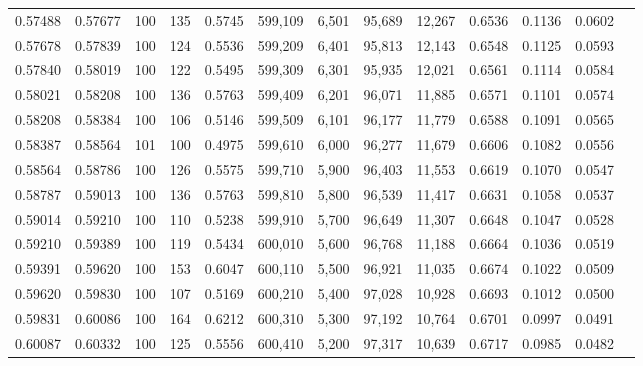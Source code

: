 \begin{tabular}{rrrrrrrrrrrrr}
0.57488 & 0.57677 &   100 & 135 &                                     0.5745 & 599,109 &   6,501 &  95,689 &  12,267 & 0.6536 & 0.1136 & 0.0602 \\
0.57678 & 0.57839 &   100 & 124 &                                     0.5536 & 599,209 &   6,401 &  95,813 &  12,143 & 0.6548 & 0.1125 & 0.0593 \\
0.57840 & 0.58019 &   100 & 122 &                                     0.5495 & 599,309 &   6,301 &  95,935 &  12,021 & 0.6561 & 0.1114 & 0.0584 \\
0.58021 & 0.58208 &   100 & 136 &                                     0.5763 & 599,409 &   6,201 &  96,071 &  11,885 & 0.6571 & 0.1101 & 0.0574 \\
0.58208 & 0.58384 &   100 & 106 &                                     0.5146 & 599,509 &   6,101 &  96,177 &  11,779 & 0.6588 & 0.1091 & 0.0565 \\
0.58387 & 0.58564 &   101 & 100 &                                     0.4975 & 599,610 &   6,000 &  96,277 &  11,679 & 0.6606 & 0.1082 & 0.0556 \\
0.58564 & 0.58786 &   100 & 126 &                                     0.5575 & 599,710 &   5,900 &  96,403 &  11,553 & 0.6619 & 0.1070 & 0.0547 \\
0.58787 & 0.59013 &   100 & 136 &                                     0.5763 & 599,810 &   5,800 &  96,539 &  11,417 & 0.6631 & 0.1058 & 0.0537 \\
0.59014 & 0.59210 &   100 & 110 &                                     0.5238 & 599,910 &   5,700 &  96,649 &  11,307 & 0.6648 & 0.1047 & 0.0528 \\
0.59210 & 0.59389 &   100 & 119 &                                     0.5434 & 600,010 &   5,600 &  96,768 &  11,188 & 0.6664 & 0.1036 & 0.0519 \\
0.59391 & 0.59620 &   100 & 153 &                                     0.6047 & 600,110 &   5,500 &  96,921 &  11,035 & 0.6674 & 0.1022 & 0.0509 \\
0.59620 & 0.59830 &   100 & 107 &                                     0.5169 & 600,210 &   5,400 &  97,028 &  10,928 & 0.6693 & 0.1012 & 0.0500 \\
0.59831 & 0.60086 &   100 & 164 &                                     0.6212 & 600,310 &   5,300 &  97,192 &  10,764 & 0.6701 & 0.0997 & 0.0491 \\
0.60087 & 0.60332 &   100 & 125 &                                     0.5556 & 600,410 &   5,200 &  97,317 &  10,639 & 0.6717 & 0.0985 & 0.0482 \\

\end{tabular}

